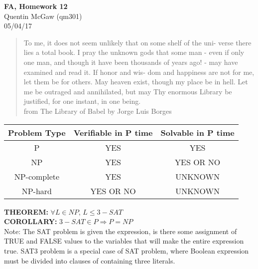 \documentclass[11pt]{article}
\begin{document}
\begin{center} {\Large\bf FA, Homework 12} \\ Quentin McGaw (qm301) \\ 05/04/17
\end{center}

\begin{quote}
To me, it does not seem unlikely that on some shelf of the uni-
verse there lies a total book. I pray the unknown gods that some
man - even if only one man, and though it have been thousands
of years ago! - may have examined and read it. If honor and wis-
dom and happiness are not for me, let them be for others. May
heaven exist, though my place be in hell. Let me be outraged
and annihilated, but may Thy enormous Library be justified, for
one instant, in one being.
\\ from The Library of Babel by Jorge Luis Borges
\end{quote}

\begin{center}
    \begin{tabular}{|c | c | c |} 
    \hline
    Problem Type & Verifiable in P time & Solvable in P time \\
    \hline
    P & YES & YES \\
    \hline
    NP & YES & YES OR NO \\
    \hline
    NP-complete & YES & UNKNOWN \\
    \hline
    NP-hard & YES OR NO & UNKNOWN \\
    \hline
    \end{tabular}
\end{center}
\textbf{THEOREM:} $\forall L \in NP \mbox{, } L \leq 3-SAT$
\\ \textbf{COROLLARY: } $3-SAT \in P \Rightarrow P = NP$
\\ Note: The SAT problem is given the expression, is there some assignment of TRUE and FALSE values to the variables that will make the entire expression true. SAT3 problem is a special case of SAT problem, where Boolean expression must be divided into clauses of containing three literals.
\end{document}
